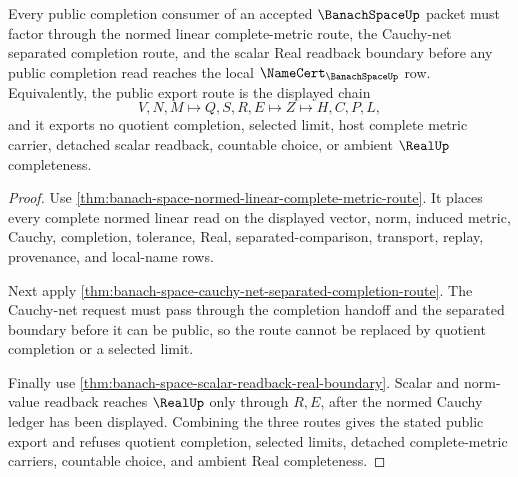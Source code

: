 \begin{theorem}
\label{thm:banach-space-public-completion-export}
Every public completion consumer of an accepted $\BanachSpaceUp$ packet must factor through the normed linear complete-metric route, the Cauchy-net separated completion route, and the scalar Real readback boundary before any public completion read reaches the local $\NameCert_{\BanachSpaceUp}$ row. Equivalently, the public export route is the displayed chain
$$
V,N,M \longmapsto Q,S,R,E \longmapsto Z \longmapsto H,C,P,L ,
$$
and it exports no quotient completion, selected limit, host complete metric carrier, detached scalar readback, countable choice, or ambient $\RealUp$ completeness.
\end{theorem}
\begin{proof}
Use \autoref{thm:banach-space-normed-linear-complete-metric-route}. It places every complete normed linear read on the displayed vector, norm, induced metric, Cauchy, completion, tolerance, Real, separated-comparison, transport, replay, provenance, and local-name rows.

Next apply \autoref{thm:banach-space-cauchy-net-separated-completion-route}. The Cauchy-net request must pass through the completion handoff and the separated boundary before it can be public, so the route cannot be replaced by quotient completion or a selected limit.

Finally use \autoref{thm:banach-space-scalar-readback-real-boundary}. Scalar and norm-value readback reaches $\RealUp$ only through $R,E$, after the normed Cauchy ledger has been displayed. Combining the three routes gives the stated public export and refuses quotient completion, selected limits, detached complete-metric carriers, countable choice, and ambient Real completeness.
\end{proof}

